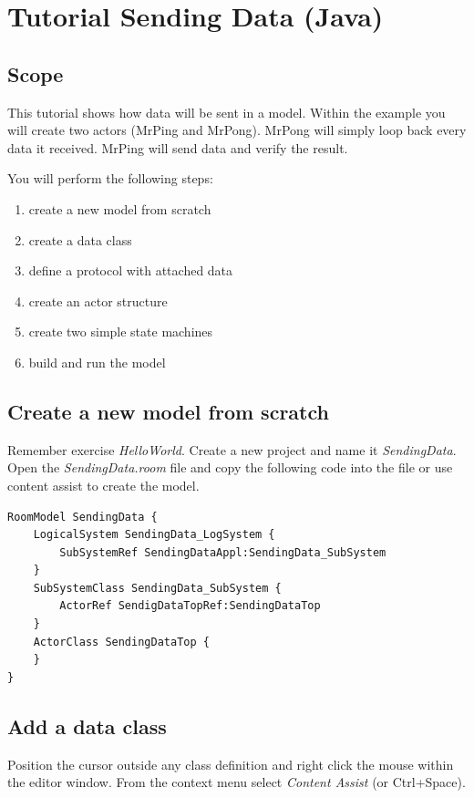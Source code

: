 \section{Tutorial Sending Data (Java)}

\subsection{Scope}

This tutorial shows how data will be sent in a \eTrice{} model. Within the example you will create two actors 
(MrPing and MrPong). MrPong will simply loop back every data it received.
MrPing will send data and verify the result.   

You will perform the following steps:

\begin{enumerate}
\item create a new model from scratch
\item create a data class
\item define a protocol with attached data
\item create an actor structure
\item create two simple state machines
\item build and run the model
\end{enumerate}

\subsection{Create a new model from scratch}

Remember exercise \textit{HelloWorld}.
Create a new \eTrice{} project and name it \textit{SendingData}.
Open the \textit{SendingData.room} file and copy the following code into the file or use content assist to 
create the model.


\begin{verbatim} 
RoomModel SendingData {
    LogicalSystem SendingData_LogSystem {
        SubSystemRef SendingDataAppl:SendingData_SubSystem 
    }
    SubSystemClass SendingData_SubSystem {
        ActorRef SendigDataTopRef:SendingDataTop 
    }
    ActorClass SendingDataTop {
    }
}
\end{verbatim}

\subsection{Add a data class}

Position the cursor outside any class definition and right click the mouse within the editor window. From 
the context menu select \textit{Content Assist} (or Ctrl+Space).  

